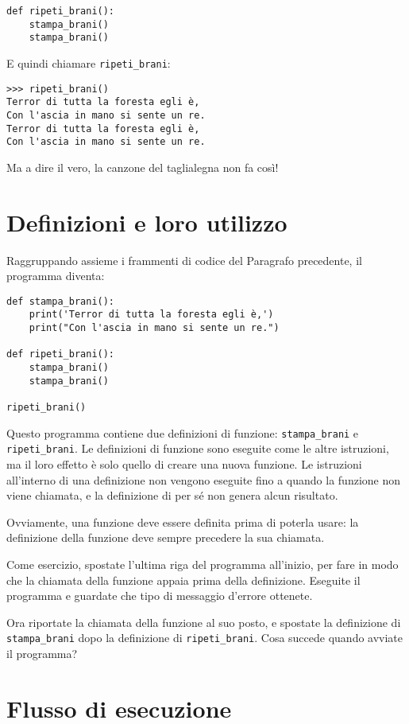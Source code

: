 \documentclass[10pt]{book}
\begin{document}
\begin{verbatim}
def ripeti_brani():
    stampa_brani()
    stampa_brani()
\end{verbatim}
%
E quindi chiamare \verb"ripeti_brani":

\begin{verbatim}
>>> ripeti_brani()
Terror di tutta la foresta egli è,
Con l'ascia in mano si sente un re.
Terror di tutta la foresta egli è,
Con l'ascia in mano si sente un re.
\end{verbatim}
%
Ma a dire il vero, la canzone del taglialegna non fa così!


\section{Definizioni e loro utilizzo}

Raggruppando assieme i frammenti di codice del Paragrafo precedente, il programma diventa:

\begin{verbatim}
def stampa_brani():
    print('Terror di tutta la foresta egli è,')
    print("Con l'ascia in mano si sente un re.")

def ripeti_brani():
    stampa_brani()
    stampa_brani()

ripeti_brani()
\end{verbatim}
%

Questo programma contiene due definizioni di funzione: \verb"stampa_brani" e
\verb"ripeti_brani".  Le definizioni di funzione sono eseguite come le altre istruzioni, ma il loro effetto è solo quello di creare una nuova funzione. Le istruzioni all'interno di una definizione non vengono eseguite fino a quando la funzione non viene chiamata, e la definizione di per sé non genera alcun risultato.

Ovviamente, una funzione deve essere definita prima di poterla usare: la definizione della funzione deve sempre precedere la sua chiamata.

Come esercizio, spostate l'ultima riga del programma all'inizio, per fare in modo che la chiamata della funzione appaia prima della definizione. Eseguite il programma e guardate che tipo di messaggio d'errore ottenete.

Ora riportate la chiamata della funzione al suo posto, e spostate la definizione di \verb"stampa_brani" dopo la definizione di \verb"ripeti_brani". Cosa succede quando avviate il programma?


\section{Flusso di esecuzione}
\end{document}
